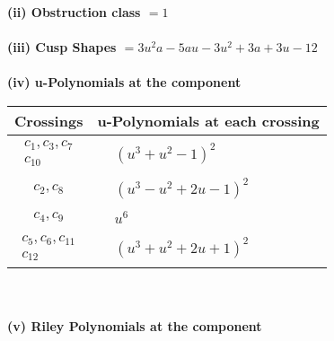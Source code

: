 \documentclass[1p]{elsarticle_modified}
\theoremstyle{definition}
\begin{document}
\flushleft \textbf{(ii) Obstruction class $= 1$}\\~\\
\flushleft \textbf{(iii) Cusp Shapes $= 3 u^2 a-5 a u-3 u^2+3 a+3 u-12$}\\~\\
\newpage\renewcommand{\arraystretch}{1}
\flushleft \textbf{(iv) u-Polynomials at the component}\newline \\
\begin{tabular}{m{50pt}|m{274pt}}
Crossings & \hspace{64pt}u-Polynomials at each crossing \\
\hline $$\begin{aligned}c_{1},c_{3},c_{7}\\c_{10}\end{aligned}$$&$\begin{aligned}
&(u^3+u^2-1)^2
\end{aligned}$\\
\hline $$\begin{aligned}c_{2},c_{8}\end{aligned}$$&$\begin{aligned}
&(u^3- u^2+2 u-1)^2
\end{aligned}$\\
\hline $$\begin{aligned}c_{4},c_{9}\end{aligned}$$&$\begin{aligned}
&u^6
\end{aligned}$\\
\hline $$\begin{aligned}c_{5},c_{6},c_{11}\\c_{12}\end{aligned}$$&$\begin{aligned}
&(u^3+u^2+2 u+1)^2
\end{aligned}$\\
\hline
\end{tabular}\\~\\
\newpage\renewcommand{\arraystretch}{1}
\flushleft \textbf{(v) Riley Polynomials at the component}\newline \\
\end{document}
